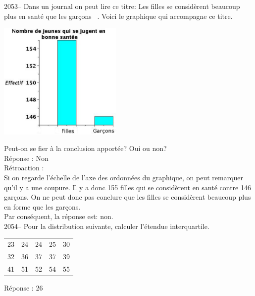 \documentclass[letterpaper, 12pt]{article}
\begin{document}
2053-- Dans un journal on peut lire ce titre: \og Les filles se consid\`erent beaucoup plus en sant\'e que les gar\c cons \fg \, . Voici le graphique qui accompagne ce titre.\\
\begin{center}
 \includegraphics[width=6cm]{Q2053.eps}
\end{center}
Peut-on se fier \`a la conclusion apport\'ee? Oui ou non?\\

R\'eponse : Non\\

R\'etroaction :\\
Si on regarde l'\'echelle de l'axe des ordonn\'ees du graphique, on peut remarquer qu'il y a une coupure. Il y a donc 155 filles qui se consid\`erent en sant\'e contre 146 gar\c cons. On ne peut donc pas conclure que les filles se consid\`erent beaucoup plus en forme que les gar\c cons.\\
Par cons\'equent, la r\'eponse est: non.\\


2054-- Pour la distribution suivante, calculer l'\'etendue interquartile.
\begin{center}
 \begin{tabular}{|c  c  c  c  c|} \hline

23 & 24 & 24 & 25 & 30\\
32 & 36 & 37 & 37 & 39 \\
41 & 51 & 52 & 54 & 55 \\ \hline

\end{tabular}
\end{center}

R\'eponse : 26\\
\end{document}
